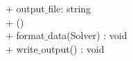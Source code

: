 {
+ output$\_$file: string \\
}
{
+ \dunder () \\
+ format$\_$data(Solver) : void\\
+ write$\_$output() : void
}